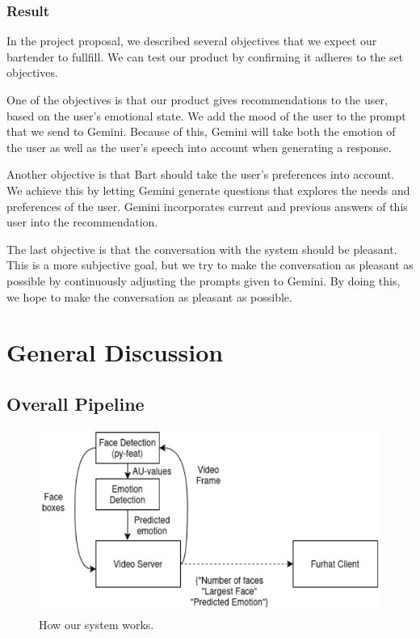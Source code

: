 \documentclass[conference]{IEEEtran}
\begin{document}
\subsubsection{Result}
In the project proposal, we described several objectives that we expect our bartender to fullfill.
We can test our product by confirming it adheres to the set objectives.

One of the objectives is that our product gives recommendations to the user, based on the user's emotional state.
We add the mood of the user to the prompt that we send to Gemini.
Because of this, Gemini will take both the emotion of the user as well as the user's speech into account when generating a response.

Another objective is that Bart should take the user's preferences into account. 
We achieve this by letting Gemini generate questions that explores the needs and preferences of the user.
Gemini incorporates current and previous answers of this user into the recommendation.

The last objective is that the conversation with the system should be pleasant.
This is a more subjective goal, but we try to make the conversation as pleasant as possible by continuously adjusting the prompts given to Gemini.
By doing this, we hope to make the conversation as pleasant as possible.


\section{General Discussion}


\subsection{Overall Pipeline}
\begin{figure}[!h]
    \includegraphics[width=\linewidth]{pipeline.png}
    \caption{How our system works.}
    \label{fig:pipeline}
  \end{figure}
\end{document}
